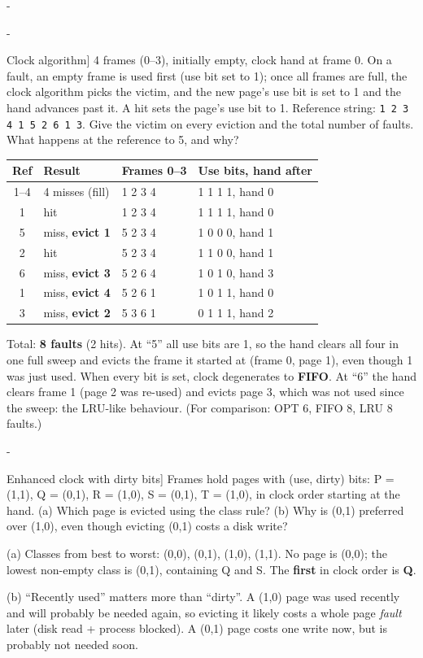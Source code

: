 \documentclass[11pt,a4paper]{article}
\makeatletter
\newcommand{\keepspace}[1]{\par\penalty-100\begingroup
  \setlength{\dimen@}{#1}\dimen@ii\pagegoal\advance\dimen@ii-\pagetotal
  \ifdim\dimen@>\dimen@ii\ifdim\dimen@ii>\z@\vfil\fi\break\fi\endgroup}
\newcounter{qn}[section]
\newcommand{\lecno}{}
\newenvironment{Qn}[2]{\refstepcounter{qn}\keepspace{8\baselineskip}%
  \begin{quizbox}[Q\lecno.\theqn\ \ [#1] #2]}{\end{quizbox}}
\newenvironment{Sol}{\begin{solbox}[Solution]}{\end{solbox}\vspace{0.4em}}
\makeatother
\begin{document}
\keepspace{26\baselineskip}
\begin{Qn}{Trace}{Clock algorithm}
4 frames (0--3), initially empty, clock hand at frame 0. On a fault, an
empty frame is used first (use bit set to 1); once all frames are full,
the clock algorithm picks the victim, and the new page's use bit is set to
1 and the hand advances past it. A hit sets the page's use bit to 1.
Reference string: \texttt{1 2 3 4 1 5 2 6 1 3}.
Give the victim on every eviction and the total number of faults. What
happens at the reference to 5, and why?
\end{Qn}
\begin{Sol}
\begin{center}
\small
\renewcommand{\arraystretch}{1.05}
\begin{tabular}{@{}clll@{}}
  \toprule
  \textbf{Ref} & \textbf{Result} & \textbf{Frames 0--3} & \textbf{Use bits, hand after} \\
  \midrule
  1--4 & 4 misses (fill) & 1 2 3 4 & 1 1 1 1, hand 0 \\
  1 & hit & 1 2 3 4 & 1 1 1 1, hand 0 \\
  5 & miss, \textbf{evict 1} & 5 2 3 4 & 1 0 0 0, hand 1 \\
  2 & hit & 5 2 3 4 & 1 1 0 0, hand 1 \\
  6 & miss, \textbf{evict 3} & 5 2 6 4 & 1 0 1 0, hand 3 \\
  1 & miss, \textbf{evict 4} & 5 2 6 1 & 1 0 1 1, hand 0 \\
  3 & miss, \textbf{evict 2} & 5 3 6 1 & 0 1 1 1, hand 2 \\
  \bottomrule
\end{tabular}
\end{center}
Total: \textbf{8 faults} (2 hits). At ``5'' all use bits are 1, so the
hand clears all four in one full sweep and evicts the frame it started at
(frame 0, page 1), even though 1 was just used. When every bit is set,
clock degenerates to \textbf{FIFO}. At ``6'' the hand clears frame 1 (page
2 was re-used) and evicts page 3, which was not used since the sweep: the
LRU-like behaviour. (For comparison: OPT 6, FIFO 8, LRU 8 faults.)
\end{Sol}

\begin{Qn}{Concept}{Enhanced clock with dirty bits}
Frames hold pages with (use, dirty) bits: P = (1,1), Q = (0,1), R = (1,0),
S = (0,1), T = (1,0), in clock order starting at the hand. (a) Which page
is evicted using the class rule? (b) Why is (0,1) preferred over (1,0),
even though evicting (0,1) costs a disk write?
\end{Qn}
\begin{Sol}
(a) Classes from best to worst: (0,0), (0,1), (1,0), (1,1). No page is
(0,0); the lowest non-empty class is (0,1), containing Q and S. The
\textbf{first} in clock order is \textbf{Q}.

(b) ``Recently used'' matters more than ``dirty''. A (1,0) page was used
recently and will probably be needed again, so evicting it likely costs a
whole page \emph{fault} later (disk read + process blocked). A (0,1) page
costs one write now, but is probably not needed soon.
\end{Sol}
\end{document}
